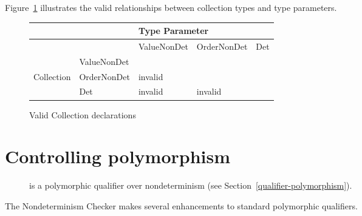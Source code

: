 Figure~\ref{fig-nondeterminism-collections} illustrates the valid
relationships between collection types and type parameters.

\begin{figure}
  \centering
  \begin{tabular}{|l|l|l|l|l|}
    \hline
    &   &  \multicolumn{3}{l|}{Type Parameter}                                                                       \\ \hline
    &             & ValueNonDet                                     & OrderNonDet              & Det \\ \cline{2-5}
              & ValueNonDet &                                                 &                          &     \\ \cline{2-5}
Collection    & OrderNonDet &   invalid  &                          &     \\ \cline{2-5}
              & Det         &   invalid               &    invalid  &     \\ \hline
  \end{tabular}
  \caption{Valid Collection declarations}
  \label{fig-nondeterminism-collections}
\end{figure}





\section{Controlling polymorphism\label{nondeterminism-polymorphism}}

\begin{description}
\item[] is a
  polymorphic qualifier over nondeterminism (see Section~\ref{qualifier-polymorphism}).
\end{description}

The Nondeterminism Checker makes
several enhancements to standard polymorphic qualifiers.


